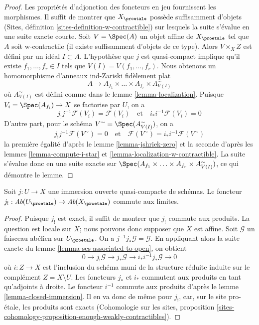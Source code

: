 \begin{proof}
Les propriétés d'adjonction des foncteurs en jeu fournissent les morphismes.
Il suffit de montrer que $X_\proetale$ possède suffisamment d'objets
(Sites, définition \ref{sites-definition-w-contractible}) sur lesquels
la suite s'évalue en une suite exacte courte.
Soit $V = \Spec(A)$ un objet affine de $X_\proetale$
tel que $A$ soit w-contractile (il existe suffisamment d'objets de ce type).
Alors $V \times_X Z$ est défini par un idéal $I \subset A$.
L'hypothèse que $j$ est quasi-compact implique qu'il existe
$f_1, \ldots, f_r \in I$ tels que $V(I) = V(f_1, \ldots, f_r)$.
Nous obtenons un homomorphisme d'anneaux ind-Zariski fidèlement plat
$$
A \longrightarrow A_{f_1} \times \ldots \times A_{f_r} \times
A_{V(I)}^\sim
$$
où $A_{V(I)}^\sim$ est défini comme dans le lemme \ref{lemma-localization}.
Puisque $V_i = \Spec(A_{f_i}) \to X$ se factorise par $U$, on a
$$
j_!j^{-1}\mathcal{F}(V_i) = \mathcal{F}(V_i)
\quad\text{et}\quad
i_*i^{-1}\mathcal{F}(V_i) = 0
$$
D'autre part, pour le schéma $V^\sim = \Spec(A_{V(I)}^\sim)$,
on a
$$
j_!j^{-1}\mathcal{F}(V^\sim) = 0
\quad\text{et}\quad
\mathcal{F}(V^\sim) = i_*i^{-1}\mathcal{F}(V^\sim)
$$
la première égalité d'après le lemme \ref{lemma-jshriek-zero}
et la seconde d'après les
lemmes \ref{lemma-compute-i-star} et \ref{lemma-localization-w-contractible}.
La suite s'évalue donc en une suite exacte sur
$\Spec(A_{f_1} \times \ldots \times A_{f_r} \times A_{V(I)}^\sim)$,
ce qui démontre le lemme.
\end{proof}

\begin{lemma}
\label{lemma-j-shriek-limits}
Soit $j : U \to X$ une immersion ouverte quasi-compacte
de schémas. Le foncteur
$j_! : \textit{Ab}(U_\proetale) \to \textit{Ab}(X_\proetale)$
commute aux limites.
\end{lemma}

\begin{proof}
Puisque $j_!$ est exact, il suffit de montrer que $j_!$ commute aux produits.
La question est locale sur $X$; nous pouvons donc supposer que $X$ est affine.
Soit $\mathcal{G}$ un faisceau abélien sur $U_\proetale$.
On a $j^{-1}j_*\mathcal{G} = \mathcal{G}$. En appliquant alors
la suite exacte du lemme \ref{lemma-ses-associated-to-open},
on obtient
$$
0 \to j_!\mathcal{G} \to j_*\mathcal{G} \to i_*i^{-1}j_*\mathcal{G} \to 0
$$
où $i : Z \to X$ est l'inclusion du schéma muni de la structure réduite
induite sur le complément $Z = X \setminus U$.
Les foncteurs $j_*$ et $i_*$ commutent aux produits en tant qu'adjoints à droite.
Le foncteur $i^{-1}$ commute aux produits d'après le
lemme \ref{lemma-closed-immersion}.
Il en va donc de même pour $j_!$, car, sur le site pro-\'etale, les produits
sont exacts
(Cohomologie sur les sites, proposition
\ref{sites-cohomology-proposition-enough-weakly-contractibles}).
\end{proof}




